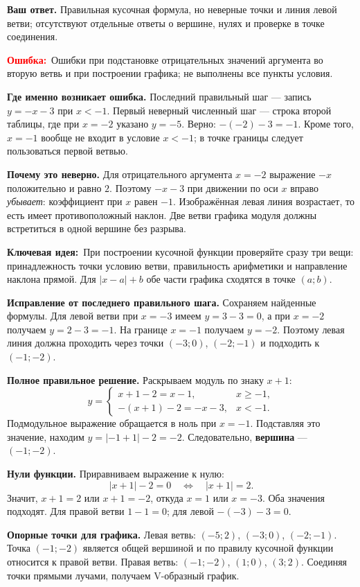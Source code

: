 \documentclass[12pt,a4paper]{article}
\newcommand{\err}{\textcolor{red}{\textbf{Ошибка:}}}
\newcommand{\idea}{\textcolor{blue!60!black}{\textbf{Ключевая идея:}}}
\begin{document}
\textbf{Ваш ответ.} Правильная кусочная формула, но неверные точки и линия левой ветви; отсутствуют отдельные ответы о вершине, нулях и проверке в точке соединения.

\err\ Ошибки при подстановке отрицательных значений аргумента во вторую ветвь и при построении графика; не выполнены все пункты условия.

\textbf{Где именно возникает ошибка.} Последний правильный шаг --- запись $y=-x-3$ при $x<-1$. Первый неверный численный шаг --- строка второй таблицы, где при $x=-2$ указано $y=-5$. Верно: $-(-2)-3=-1$. Кроме того, $x=-1$ вообще не входит в условие $x<-1$; в точке границы следует пользоваться первой ветвью.

\textbf{Почему это неверно.} Для отрицательного аргумента $x=-2$ выражение $-x$ положительно и равно $2$. Поэтому $-x-3$ при движении по оси $x$ вправо \emph{убывает}: коэффициент при $x$ равен $-1$. Изображённая левая линия возрастает, то есть имеет противоположный наклон. Две ветви графика модуля должны встретиться в одной вершине без разрыва.

\idea\ При построении кусочной функции проверяйте сразу три вещи: принадлежность точки условию ветви, правильность арифметики и направление наклона прямой. Для $|x-a|+b$ обе части графика сходятся в точке $(a;b)$.

\textbf{Исправление от последнего правильного шага.} Сохраняем найденные формулы. Для левой ветви при $x=-3$ имеем $y=3-3=0$, а при $x=-2$ получаем $y=2-3=-1$. На границе $x=-1$ получаем $y=-2$. Поэтому левая линия должна проходить через точки $(-3;0)$, $(-2;-1)$ и подходить к $(-1;-2)$.

\textbf{Полное правильное решение.} Раскрываем модуль по знаку $x+1$:
\[
y=\begin{cases}
x+1-2=x-1,&x\geqslant-1,\\
-(x+1)-2=-x-3,&x<-1.
\end{cases}
\]
Подмодульное выражение обращается в ноль при $x=-1$. Подставляя это значение, находим $y=|-1+1|-2=-2$. Следовательно, \textbf{вершина} --- $(-1;-2)$.

\textbf{Нули функции.} Приравниваем выражение к нулю:
\[
|x+1|-2=0\quad\Longleftrightarrow\quad |x+1|=2.
\]
Значит, $x+1=2$ или $x+1=-2$, откуда $x=1$ или $x=-3$. Оба значения подходят. Для правой ветви $1-1=0$; для левой $-(-3)-3=0$.

\textbf{Опорные точки для графика.} Левая ветвь: $(-5;2)$, $(-3;0)$, $(-2;-1)$. Точка $(-1;-2)$ является общей вершиной и по правилу кусочной функции относится к правой ветви. Правая ветвь: $(-1;-2)$, $(1;0)$, $(3;2)$. Соединяя точки прямыми лучами, получаем V-образный график.
\end{document}
